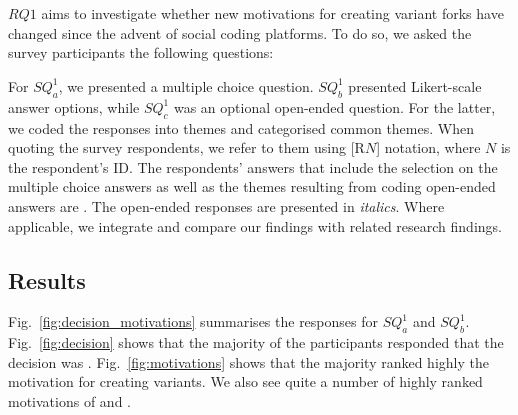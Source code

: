 \section{\RQOne}
\label{sec:results-RQ1}
$RQ1$ aims to investigate whether new motivations for creating variant forks have changed since the advent of social coding platforms. To do so, we asked the survey participants the following questions:

\noindent \rqOneOne

\noindent \rqOneTwo

\noindent \rqOneThree



For $SQ^1_{a}$, we presented a multiple choice question.  $SQ^1_{b}$ presented Likert-scale answer options, while $SQ^1_{c}$ was an optional open-ended question. For the latter, we coded the responses into themes and categorised common themes.
When quoting the survey respondents, we refer to them using [R$N$] notation, where $N$ is the respondent's ID.
The respondents' answers that include the selection on the multiple choice answers as well as the themes resulting from coding open-ended answers are .
The open-ended responses are presented in \emph{italics}.
Where applicable, we integrate and compare our findings with related research findings.

\subsection{Results}
Fig.~\ref{fig:decision_motivations} summarises the responses for $SQ^1_{a}$ and $SQ^1_{b}$. Fig.~\ref{fig:decision} shows that the majority of the participants responded that the decision was . Fig.~\ref{fig:motivations} shows that the majority ranked highly the  motivation for creating variants. We also see quite a number of highly ranked motivations of  and .

